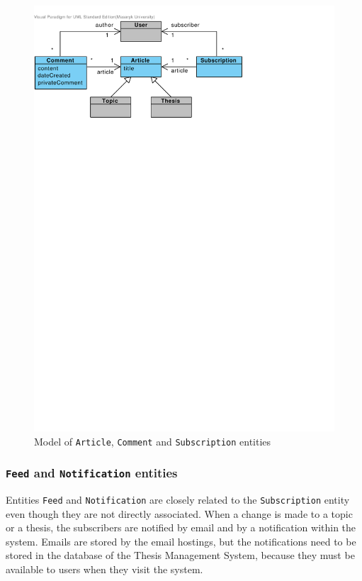 \begin{figure}[h]
    \centering
        \includegraphics[trim=0 620 180 30, clip, keepaspectratio, width=\textwidth]{./images/domain-article-comment-subscription-entities.pdf}
    \caption{Model of \texttt{Article}, \texttt{Comment} and \texttt{Subscription} entities}
    \label{fig:domain-article-comment-subscription-entities}
\end{figure}

\subsubsection{\textbf{\texttt{Feed} and \texttt{Notification} entities}}

Entities \texttt{Feed} and \texttt{Notification} are closely related to the \texttt{Subscription} entity even though they are not directly associated. When a change is made to a topic or a thesis, the subscribers are notified by email and by a notification within the system. Emails are stored by the email hostings, but the notifications need to be stored in the database of the Thesis Management System, because they must be available to users when they visit the system.

